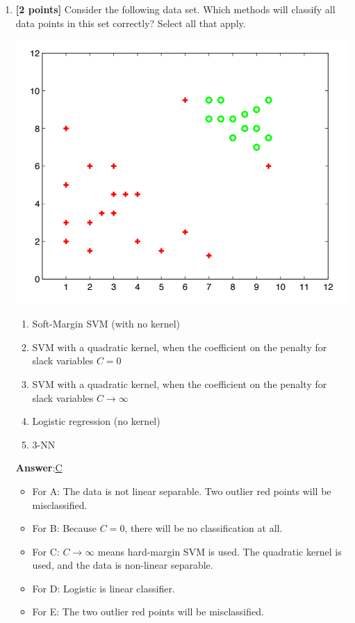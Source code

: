\begin{enumerate}
	\item {\textbf{[2 points]} Consider the following data set. Which methods will classify all data points in this set correctly? Select all that apply. \\
		\begin{minipage}[!ht]{0.5\textwidth}
			\centering
			\includegraphics[width=1.0\textwidth]{mcq_data.png}
			\label{fig:svm_quad_a}
		\end{minipage}
		\begin{minipage}[!ht]{0.5\textwidth}
			\begin{enumerate}[label=\Alph*)]
				\item Soft-Margin SVM (with no kernel)
				\item SVM with a quadratic kernel, when the coefficient on the penalty for slack variables $C = 0$
				\item SVM with a quadratic kernel, when the coefficient on the penalty for slack variables $C \rightarrow \infty$
				\item Logistic regression (no kernel)
				\item 3-NN
			\end{enumerate}
		\end{minipage} 
	}
	\textbf{Answer}:\underline{C}\\
	\begin{itemize}
		\item For A: The data is not linear separable. Two outlier red points will be misclassified.
		\item For B: Because $C=0$, there will be no classification at all.
		\item For C: $C\rightarrow \infty$ means hard-margin SVM is used. The quadratic kernel is used, and the data is non-linear separable.
		\item For D: Logistic is linear classifier.
		\item For E: The two outlier red points will be misclassified.
	\end{itemize}
	
\end{enumerate}

\newpage
